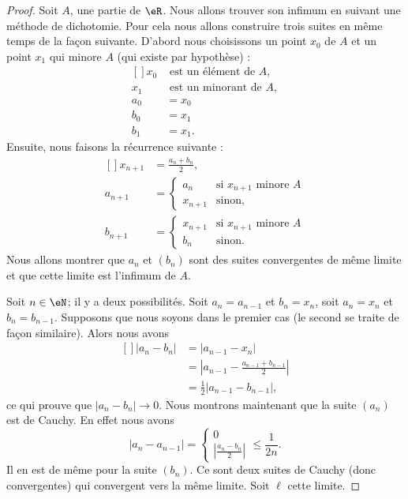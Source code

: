\begin{proof}
	Soit $A$, une partie de $\eR$. Nous allons trouver son infimum en suivant une méthode de dichotomie. Pour cela nous allons construire trois suites en même temps de la façon suivante. D'abord nous choisissons un point $x_0$ de $A$ et un point $x_1$ qui minore $A$ (qui existe par hypothèse) :
	\begin{equation}
		\begin{aligned}[]
			x_0&\text{ est un élément de $A$},\\
			x_1&\text{ est un minorant de $A$},\\
			a_0&=x_0\\
			b_0&=x_1\\
			b_1&=x_1.
		\end{aligned}
	\end{equation}
	Ensuite, nous faisons la récurrence suivante :
	\begin{equation}
		\begin{aligned}[]
			x_{n+1}&=\frac{ a_n+b_n }{2},\\
			a_{n+1}&=\begin{cases}
				a_{n}	&	\text{si $x_{n+1}$ minore $A$}\\
				x_{n+1}	&	 \text{sinon},
			\end{cases}\\
			b_{n+1}&=\begin{cases}
				x_{n+1}	&	\text{si $x_{n+1}$ minore $A$}\\
				b_n	&	 \text{sinon}.
			\end{cases}
		\end{aligned}
	\end{equation}
    Nous allons montrer que \( a_n\) et \( (b_n)\) sont des suites convergentes de même limite et que cette limite est l'infimum de \( A\).

	Soit $n\in\eN$; il y a deux possibilités. Soit $a_n=a_{n-1}$ et $b_n=x_n$, soit $a_n=x_n$ et $b_n=b_{n-1}$. Supposons que nous soyons dans le premier cas (le second se traite de façon similaire). Alors nous avons
	\begin{equation}
		\begin{aligned}[]
			| a_n-b_n |&=| a_{n-1}-x_n |\\
			&=\left| a_{n-1}-\frac{ a_{n-1}+b_{n-1} }{2} \right| \\
			&=\frac{ 1 }{2}| a_{n-1}-b_{n-1} |,
		\end{aligned}
	\end{equation}
	ce qui prouve que $| a_n-b_n |\to 0$. Nous montrons maintenant que la suite \( (a_n)\) est de Cauchy. En effet nous avons
    \begin{equation}
        | a_n-a_{n-1} |=\begin{cases}
          0\\
          \left| \frac{ a_n -b_n}{ 2} \right|   
      \end{cases}\leq \frac{1}{ 2n }.
    \end{equation}
    Il en est de même pour la suite \( (b_n)\). Ce sont deux suites de Cauchy (donc convergentes) qui convergent vers la même limite. Soit \( \ell\) cette limite.
    

\end{proof}
